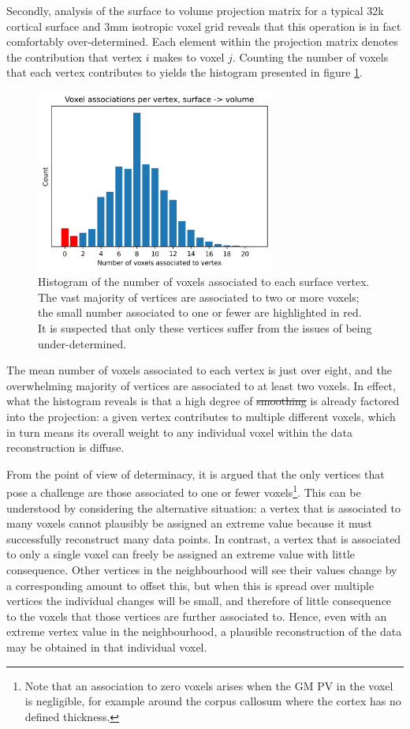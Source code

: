 \documentclass[12pt]{report}
\providecommand{\DIFaddtex}[1]{{\protect\color{blue}\uwave{#1}}} %
\providecommand{\DIFdeltex}[1]{{\protect\color{red}\sout{#1}}}                      %
\providecommand{\DIFaddbegin}{} %
\providecommand{\DIFaddend}{} %
\providecommand{\DIFdelbegin}{} %
\providecommand{\DIFdelend}{} %
\providecommand{\DIFadd}[1]{\texorpdfstring{\DIFaddtex{#1}}{#1}} %
\providecommand{\DIFdel}[1]{\texorpdfstring{\DIFdeltex{#1}}{}} %
\newcommand{\DIFscaledelfig}{0.5}
\newlength{\DIFdelgraphicswidth} %
\newlength{\DIFdelgraphicsheight} %
\newcommand{\DIFaddincludegraphics}[2][]{{\color{blue}\fbox{\DIFOincludegraphics[#1]{#2}}}} %
\newcommand{\DIFdelincludegraphics}[2][]{%
\sbox{\DIFdelgraphicsbox}{\DIFOincludegraphics[#1]{#2}}%
\settoboxwidth{\DIFdelgraphicswidth}{\DIFdelgraphicsbox} %
\settoboxtotalheight{\DIFdelgraphicsheight}{\DIFdelgraphicsbox} %
\scalebox{\DIFscaledelfig}{%
\parbox[b]{\DIFdelgraphicswidth}{\usebox{\DIFdelgraphicsbox}\\[-\baselineskip] \rule{\DIFdelgraphicswidth}{0em}}\llap{\resizebox{\DIFdelgraphicswidth}{\DIFdelgraphicsheight}{%
\setlength{\unitlength}{\DIFdelgraphicswidth}%
\begin{picture}(1,1)%
\thicklines\linethickness{2pt} %
{\color[rgb]{1,0,0}\put(0,0){\framebox(1,1){}}}%
{\color[rgb]{1,0,0}\put(0,0){\line( 1,1){1}}}%
{\color[rgb]{1,0,0}\put(0,1){\line(1,-1){1}}}%
\end{picture}%
}\hspace*{3pt}}} %
} %
\DeclareRobustCommand{\DIFaddbegin}{\DIFOaddbegin \let\includegraphics\DIFaddincludegraphics} %
\DeclareRobustCommand{\DIFaddend}{\DIFOaddend \let\includegraphics\DIFOincludegraphics} %
\DeclareRobustCommand{\DIFdelbegin}{\DIFOdelbegin \let\includegraphics\DIFdelincludegraphics} %
\DeclareRobustCommand{\DIFdelend}{\DIFOaddend \let\includegraphics\DIFOincludegraphics} %
\begin{document}
Secondly, analysis of the surface to volume projection matrix for a typical 32k cortical surface and 3mm isotropic voxel grid reveals that this operation is in fact comfortably over-determined. Each element within the projection matrix denotes the contribution that vertex $i$ makes to voxel $j$. Counting the number of voxels that each vertex contributes to yields the histogram presented in figure \ref{vox_per_vtx}. 

\begin{figure}[H]
\centering
\includegraphics[width=0.7\textwidth]{vox_per_vtx.png}
\caption{Histogram of the number of voxels associated to each surface vertex. The vast majority of vertices are associated to two or more voxels; the small number associated to one or fewer are highlighted in red. It is suspected that only these vertices suffer from the issues of being under-determined.}
\label{vox_per_vtx} 
\end{figure}

The mean number of voxels associated to each vertex is just over eight, and the overwhelming majority of vertices are associated to at least two voxels. In effect, what the histogram reveals is that a high degree of \DIFdelbegin \DIFdel{smoothing }\DIFdelend \DIFaddbegin \DIFadd{regularisation }\DIFaddend is already factored into the projection: a given vertex contributes to multiple different voxels, which in turn means its overall weight to any individual voxel within the data reconstruction is diffuse. 

From the point of view of determinacy, it is argued that the only vertices that pose a challenge are those associated to one or fewer voxels\footnote{Note that an association to zero voxels arises when the GM PV in the voxel is negligible, for example around the corpus callosum where the cortex has no defined thickness.}. This can be understood by considering the alternative situation: a vertex that is associated to many voxels cannot plausibly be assigned an extreme value because it must successfully reconstruct many data points. In contrast, a vertex that is associated to only a single voxel can freely be assigned an extreme value with little consequence. Other vertices in the neighbourhood will see their values change by a corresponding amount to offset this, but when this is spread over multiple vertices the individual changes will be small, and therefore of little consequence to the voxels that those vertices are further associated to. Hence, even with an extreme vertex value in the neighbourhood, a plausible reconstruction of the data may be obtained in that individual voxel. 
\end{document}
